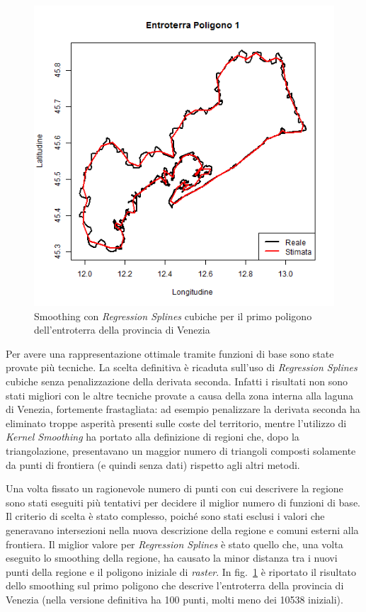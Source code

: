 \documentclass[a4paper,11pt,twoside,openright]{book}							%
\begin{document}
\begin{figure}[t]
\begin{minipage}{.32\textwidth}
	\end{minipage}%
	\begin{minipage}{.64\textwidth}
	\includegraphics[width=\textwidth]{Immagini/Ven_Regione.png}
	\end{minipage}
	\caption{Smoothing con \textit{Regression Splines} cubiche per il primo poligono dell'entroterra della provincia di Venezia}
	\label{fig:Ven_ent1}
\end{figure}

Per avere una rappresentazione ottimale tramite funzioni di base sono state provate più tecniche. La scelta definitiva è ricaduta sull'uso di \textit{Regression Splines} cubiche senza penalizzazione della derivata seconda. Infatti i risultati non sono stati migliori con le altre tecniche provate a causa della zona interna alla laguna di Venezia, fortemente frastagliata: ad esempio penalizzare la derivata seconda ha eliminato troppe asperità presenti sulle coste del territorio, mentre l'utilizzo di \textit{Kernel Smoothing} ha portato alla definizione di regioni che, dopo la triangolazione, presentavano un maggior numero di triangoli composti solamente da punti di frontiera (e quindi senza dati) rispetto agli altri metodi.

Una volta fissato un ragionevole numero di punti con cui descrivere la regione sono stati eseguiti più tentativi per decidere il miglior numero di funzioni di base. Il criterio di scelta è stato complesso, poiché sono stati esclusi i valori che generavano intersezioni nella nuova descrizione della regione e comuni esterni alla frontiera. Il miglior valore per \textit{Regression Splines} è stato quello che, una volta eseguito lo smoothing della regione, ha causato la minor distanza tra i nuovi punti della regione e il poligono iniziale di \textit{raster}. In fig.~\ref{fig:Ven_ent1} è riportato il risultato dello smoothing sul primo poligono che descrive l'entroterra della provincia di Venezia (nella versione definitiva ha 100 punti, molti meno dei 10538 iniziali).  
\end{document}
